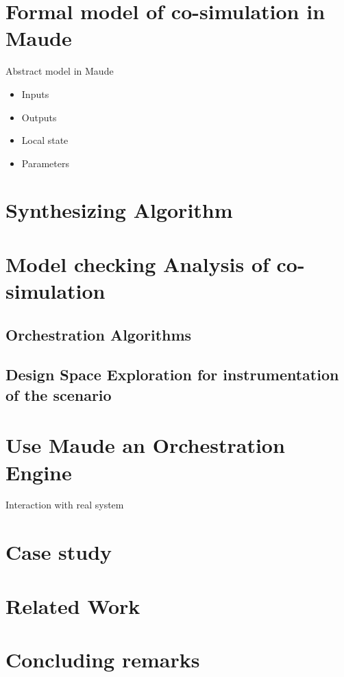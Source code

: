 \documentclass[runningheads]{llncs}
\begin{document}
\section{Formal model of co-simulation in Maude}
Abstract model in Maude 
\begin{itemize}
  \item Inputs
  \item Outputs
  \item Local state
  \item Parameters
\end{itemize}

\section{Synthesizing Algorithm}

\section{Model checking Analysis of co-simulation}
  \subsection{Orchestration Algorithms}
  \subsection{Design Space Exploration for instrumentation of the scenario}

\section{Use Maude an Orchestration Engine}

Interaction with real system

\section{Case study}

\section{Related Work}

\section{Concluding remarks}
\end{document}
